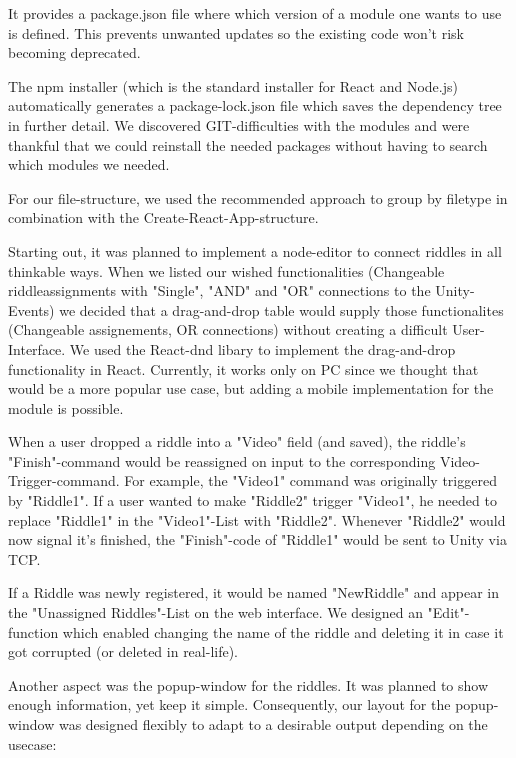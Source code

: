 It provides a package.json file where  which version of a module one wants to use is defined. 
This prevents unwanted updates so the existing code won't risk becoming deprecated.

The npm installer (which is the standard installer for React and Node.js) automatically generates a package-lock.json file which saves the dependency tree in further detail.
We discovered GIT-difficulties with the modules and were thankful that we could reinstall the needed packages without having to search which modules we needed.

For our file-structure, we used the recommended approach to group by filetype \parencite{reactStructure} in combination with the Create-React-App-structure.

Starting out, it was planned to implement a node-editor to connect riddles in all thinkable ways. 
When we listed our wished functionalities (Changeable riddleassignments with "Single", "AND" and "OR" connections to the Unity-Events) we decided that a drag-and-drop table would supply those functionalites (Changeable assignements, OR connections) without creating a difficult User-Interface.
We used the React-dnd libary \parencite{reactDND} to implement the drag-and-drop functionality in React. Currently, it works only on PC since we thought that would be a more popular use case, but adding a mobile implementation for the module is possible.

When a user dropped a riddle into a "Video" field (and saved), the riddle's "Finish"-command would be reassigned on input to the corresponding Video-Trigger-command. 
For example, the "Video1" command was originally triggered by "Riddle1". 
If a user wanted to make "Riddle2" trigger "Video1", he needed to replace "Riddle1" in the "Video1"-List with "Riddle2". 
Whenever "Riddle2" would now signal it's finished, the "Finish"-code of "Riddle1" would be sent to Unity via TCP.

If a Riddle was newly registered, it would be named "NewRiddle" and appear in the "Unassigned Riddles"-List on the web interface.
We designed an "Edit"-function which enabled changing the name of the riddle and deleting it in case it got corrupted (or deleted in real-life).

Another aspect was the popup-window for the riddles. It was planned to show enough information, yet keep it simple. 
Consequently, our layout for the popup-window was designed flexibly to adapt to a desirable output depending on the usecase:

